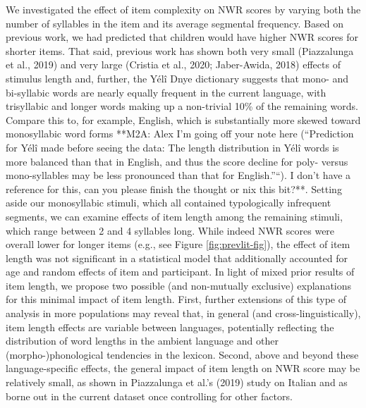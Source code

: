\documentclass[english,,man,floatsintext]{apa6}
\begin{document}
We investigated the effect of item complexity on NWR scores by varying
both the number of syllables in the item and its average segmental
frequency. Based on previous work, we had predicted that children would
have higher NWR scores for shorter items. That said, previous work has
shown both very small (Piazzalunga et al., 2019) and very large (Cristia
et al., 2020; Jaber-Awida, 2018) effects of stimulus length and,
further, the Yélî Dnye dictionary suggests that mono- and bi-syllabic
words are nearly equally frequent in the current language, with
trisyllabic and longer words making up a non-trivial 10\% of the
remaining words. Compare this to, for example, English, which is
substantially more skewed toward monosyllabic word forms **M2A: Alex I'm
going off your note here (``Prediction for Yélî made before seeing the
data: The length distribution in Yélî words is more balanced than that
in English, and thus the score decline for poly- versus mono-syllables
may be less pronounced than that for English.''``). I don't have a
reference for this, can you please finish the thought or nix this
bit?**. Setting aside our monosyllabic stimuli, which all contained
typologically infrequent segments, we can examine effects of item length
among the remaining stimuli, which range between 2 and 4 syllables long.
While indeed NWR scores were overall lower for longer items (e.g., see
Figure \ref{fig:prevlit-fig}), the effect of item length was not
significant in a statistical model that additionally accounted for age
and random effects of item and participant. In light of mixed prior
results of item length, we propose two possible (and non-mutually
exclusive) explanations for this minimal impact of item length. First,
further extensions of this type of analysis in more populations may
reveal that, in general (and cross-linguistically), item length effects
are variable between languages, potentially reflecting the distribution
of word lengths in the ambient language and other (morpho-)phonological
tendencies in the lexicon. Second, above and beyond these
language-specific effects, the general impact of item length on NWR
score may be relatively small, as shown in Piazzalunga et al.'s (2019)
study on Italian and as borne out in the current dataset once
controlling for other factors.
\end{document}
